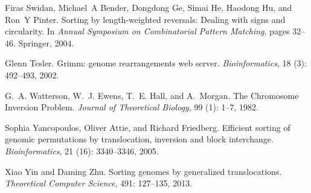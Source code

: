 \documentclass[utf8]{Frontiers_LaTex_Templates/frontiersFPHY} %
\numberwithin{equation}{section}
\begin{document}
\begin{thebibliography}{38}
Firas Swidan, Michael~A Bender, Dongdong Ge, Simai He, Haodong Hu, and Ron~Y
  Pinter.
\newblock Sorting by length-weighted reversals: Dealing with signs and
  circularity.
\newblock In \emph{Annual Symposium on Combinatorial Pattern Matching}, pages
  32--46. Springer, 2004.

Glenn Tesler.
\newblock Grimm: genome rearrangements web server.
\newblock \emph{Bioinformatics}, 18 (3): 492--493, 2002.

G.~A. Watterson, W.~J. Ewens, T.~E. Hall, and A.~Morgan.
\newblock The {C}hromosome {I}nversion {P}roblem.
\newblock \emph{Journal of Theoretical Biology}, 99 (1):
  1--7, 1982.

Sophia Yancopoulos, Oliver Attie, and Richard Friedberg.
\newblock Efficient sorting of genomic permutations by translocation, inversion
  and block interchange.
\newblock \emph{Bioinformatics}, 21 (16): 3340--3346, 2005.

Xiao Yin and Daming Zhu.
\newblock Sorting genomes by generalized translocations.
\newblock \emph{Theoretical Computer Science}, 491: 127--135, 2013.

\end{thebibliography}
\end{document}
